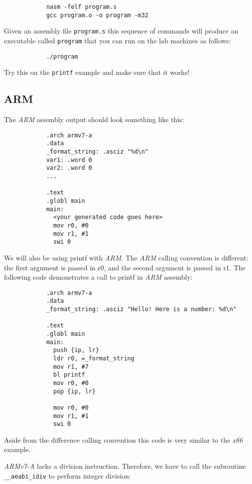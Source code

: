 \documentclass{article}
\newcommand{\code}[1]{\texttt{\textmd{#1}}}
\begin{document}
		\begin{lstlisting}
			nasm -felf program.s
			gcc program.o -o program -m32
		\end{lstlisting}

		Given an assembly file \texttt{program.s} this sequence of commands will produce an executable called
		\texttt{program} that you can run on the lab machines as follows:

		\begin{lstlisting}
			./program
		\end{lstlisting}

		Try this on the \code{printf} example and make sure that it works!


	\subsection{ARM}

		The \textit{ARM} assembly output should look something like this:

		\begin{lstlisting}
			.arch armv7-a
			.data
			_format_string: .asciz "%d\n"
			var1: .word 0
			var2: .word 0
			...

			.text
			.globl main
			main:
			  <your generated code goes here>
			  mov r0, #0
			  mov r1, #1
			  swi 0
		\end{lstlisting}

		We will also be using printf with \textit{ARM}. The \textit{ARM} calling convention is different: the first
		argument is passed in r0, and the second argument is passed in r1. The following code demonstrates a call to
		printf in \textit{ARM} assembly:

		\begin{lstlisting}
			.arch armv7-a
			.data
			_format_string: .asciz "Hello! Here is a number: %d\n"

			.text
			.globl main
			main:
			  push {ip, lr}
			  ldr r0, =_format_string
			  mov r1, #7
			  bl printf
			  mov r0, #0
			  pop {ip, lr}

			  mov r0, #0
			  mov r1, #1
			  swi 0
		\end{lstlisting}

		Aside from the difference calling convention this code is very similar to the \textit{x86} example.

		\textit{ARMv7-A} lacks a division instruction. Therefore, we have to call the subroutine
		\texttt{\_\_aeabi\_idiv} to perform integer division:
\end{document}
